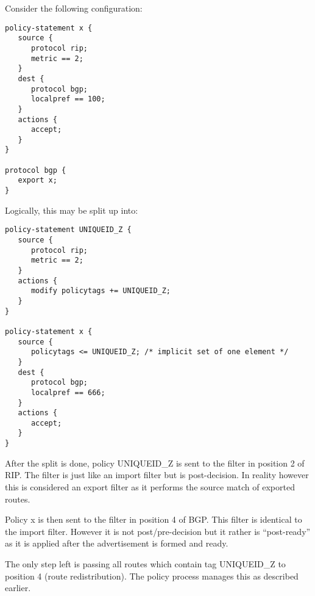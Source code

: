 \documentclass{article}
\begin{document}
Consider the following configuration:
\begin{verbatim}
policy-statement x {
   source {
      protocol rip;
      metric == 2;
   }
   dest {
      protocol bgp;
      localpref == 100;
   }
   actions {
      accept;
   }
}

protocol bgp {
   export x;
}
\end{verbatim}
Logically, this may be split up into:
\begin{verbatim}
policy-statement UNIQUEID_Z {
   source {
      protocol rip;
      metric == 2;
   }
   actions {
      modify policytags += UNIQUEID_Z;
   }
}

policy-statement x {
   source {
      policytags <= UNIQUEID_Z; /* implicit set of one element */
   }
   dest {
      protocol bgp;
      localpref == 666;
   }
   actions {
      accept;
   }
}
\end{verbatim}
After the split is done, policy UNIQUEID\_Z is sent to the filter in position 2
of RIP. The filter is just like an import filter but is post-decision.  In
reality however this is considered an export filter as it performs the source
match of exported routes.

Policy x is then sent to the filter in position 4 of BGP. This filter is
identical to the import filter. However it is not post/pre-decision but it
rather is ``post-ready'' as it is applied after the advertisement is formed and
ready.

The only step left is passing all routes which contain tag UNIQUEID\_Z to
position 4 (route redistribution). The policy process manages this as described
earlier.
\end{document}
